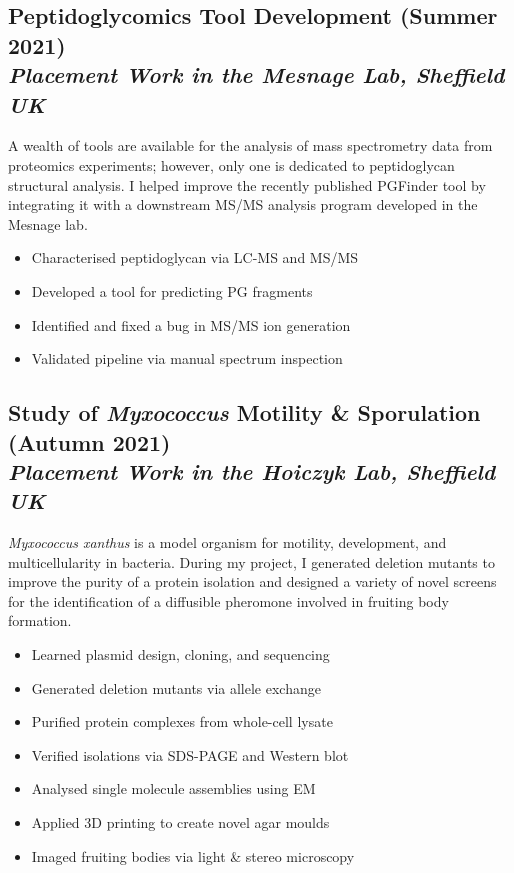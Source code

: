 \documentclass[twocolumn, a4paper, fontsize=9pt, headsepline, footsepline]{scrartcl}
\begin{document}
\subsection*{Peptidoglycomics Tool Development (Summer 2021)\\\vspace{-3pt}\textmd{\emph{Placement Work
    in the Mesnage Lab, Sheffield UK}}}
\noindent
A wealth of tools are available for the analysis of mass spectrometry data from
proteomics experiments; however, only one is dedicated to peptidoglycan
structural analysis. I helped improve the recently published PGFinder tool by
integrating it with a downstream MS/MS analysis program developed in the Mesnage
lab.
\begin{itemize}
\item Characterised peptidoglycan via LC-MS and MS/MS
\item Developed a tool for predicting PG fragments
\item Identified and fixed a bug in MS/MS ion generation
\item Validated pipeline via manual spectrum inspection
\end{itemize}

\subsection*{Study of \emph{Myxococcus} Motility \& Sporulation (Autumn 2021)\\\vspace{-3pt}\textmd{\emph{Placement Work
    in the Hoiczyk Lab, Sheffield UK}}}
\noindent
\emph{Myxococcus xanthus} is a model organism for motility, development, and
multicellularity in bacteria. During my project, I generated deletion mutants to
improve the purity of a protein isolation and designed a variety of novel
screens for the identification of a diffusible pheromone involved in fruiting
body formation.
\begin{itemize}
\item Learned plasmid design, cloning, and sequencing
\item Generated deletion mutants via allele exchange
\item Purified protein complexes from whole-cell lysate
\item Verified isolations via SDS-PAGE and Western blot
\item Analysed single molecule assemblies using EM
\item Applied 3D printing to create novel agar moulds
\item Imaged fruiting bodies via light \& stereo microscopy
\end{itemize}
\pagebreak
\end{document}
